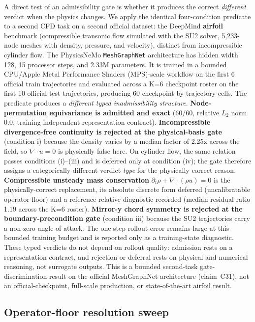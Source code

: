 \documentclass[preprint,12pt,authoryear]{elsarticle}
\begin{document}
A direct test of an admissibility gate is whether it produces the correct \emph{different} verdict when the physics changes. We apply the identical four-condition predicate to a second CFD task on a second official dataset: the DeepMind \textbf{airfoil} benchmark (compressible transonic flow simulated with the SU2 solver, 5{,}233-node meshes with density, pressure, and velocity), distinct from incompressible cylinder flow. The PhysicsNeMo \texttt{MeshGraphNet} architecture has hidden width 128, 15 processor steps, and 2.33M parameters. It is trained in a bounded CPU/Apple Metal Performance Shaders (MPS)-scale workflow on the first 6 official train trajectories and evaluated across a K=6 checkpoint roster on the first 10 official test trajectories, producing 60 checkpoint-by-trajectory cells. The predicate produces a \emph{different typed inadmissibility structure}. \textbf{Node-permutation equivariance is admitted and exact} (60/60, relative \(L_2\) norm 0.0, training-independent representation contract). \textbf{Incompressible divergence-free continuity is rejected at the physical-basis gate} (condition i) because the density varies by a median factor of 2.25x across the field, so $\nabla\cdot u=0$ is physically false here. On cylinder flow, the same relation passes conditions (i)--(iii) and is deferred only at condition (iv); the gate therefore assigns a categorically different verdict \emph{type} for the physically correct reason. \textbf{Compressible unsteady mass conservation} $\partial_t\rho+\nabla\cdot(\rho u)=0$ is the physically-correct replacement, its absolute discrete form deferred (uncalibratable operator floor) and a reference-relative diagnostic recorded (median residual ratio 1.19 across the K=6 roster). \textbf{Mirror-y chord symmetry is rejected at the boundary-precondition gate} (condition iii) because the SU2 trajectories carry a non-zero angle of attack. The one-step rollout error remains large at this bounded training budget and is reported only as a training-state diagnostic. These typed verdicts do not depend on rollout quality: admission rests on a representation contract, and rejection or deferral rests on physical and numerical reasoning, not surrogate outputs. This is a bounded second-task gate-discrimination result on the official MeshGraphNet architecture (claim~C31), not an official-checkpoint, full-scale production, or state-of-the-art airfoil result.

\subsection{Operator-floor resolution sweep}
\label{subsec:operator-floor-sweep}
\end{document}
